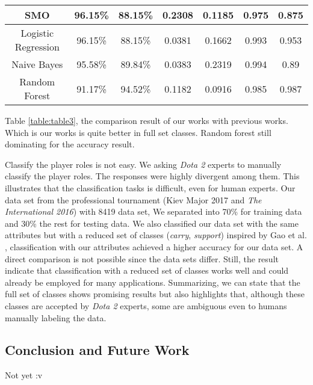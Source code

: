 \begin{table}[]
{\begin{tabular}{|c|c|c|c|c|c|c|}
SMO                             & 96.15\%            & 88.15\%           & 0.2308                  & 0.1185                  & 0.975                & 0.875                \\ \hline
Logistic Regression             & 96.15\%            & 88.15\%           & 0.0381                  & 0.1662                  & 0.993                & 0.953                \\ \hline
Naive Bayes                     & 95.58\%            & 89.84\%           & 0.0383                  & 0.2319                  & 0.994                & 0.89                 \\ \hline
Random Forest                   & 91.17\%            & 94.52\%           & 0.1182                  & 0.0916                  & 0.985                & 0.987                \\ \hline
\end{tabular}%
}
\end{table}

Table \ref{table:table3}, the comparison result of our works with previous works. Which is our works is quite better in full set classes. Random forest still dominating for the accuracy result.

Classify the player roles is not easy. We asking \textit{Dota 2} experts to manually classify the player roles. The responses were highly divergent among them. This illustrates that the classification tasks is difficult, even for human experts. Our data set from the professional tournament (Kiev Major 2017 and \textit{The International 2016}) with 8419 data set, We separated into 70\% for training data and 30\% the rest for testing data. We also classified our data set with the same attributes but with a reduced set of classes (\textit{carry}, \textit{support}) inspired by Gao et al. \cite{gao2013classifying}, classification with our attributes achieved a higher accuracy for our data set. A direct comparison is not possible since the data sets differ. Still, the result indicate that classification with a reduced set of classes works well and could already be employed for many applications. Summarizing, we can state that the full set of classes shows promising results but also highlights that, although these classes are accepted by \textit{Dota 2} experts, some are ambiguous even to humans manually labeling the data.

\subsection{Conclusion and Future Work}
\label{sec:conclusion}

Not yet :v

